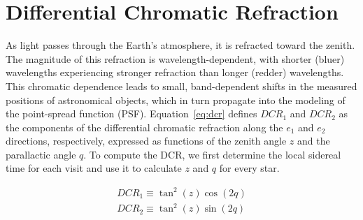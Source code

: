 \section{Differential Chromatic Refraction}
As light passes through the Earth’s atmosphere, it is refracted toward the zenith. 
The magnitude of this refraction is wavelength-dependent, with shorter (bluer) wavelengths 
experiencing stronger refraction than longer (redder) wavelengths. This chromatic dependence 
leads to small, band-dependent shifts in the measured positions of astronomical objects, 
which in turn propagate into the modeling of the point-spread function (PSF). 
Equation~\ref{eq:dcr} defines $DCR_1$ and $DCR_2$ as the components of the differential 
chromatic refraction along the $e_1$ and $e_2$ directions, respectively, expressed as 
functions of the zenith angle $z$ and the parallactic angle $q$. To compute the DCR, 
we first determine the local sidereal time for each visit and use it to calculate 
$z$ and $q$ for every star.

\begin{equation}
\label{eq:dcr}
    \begin{aligned}
        DCR_1 \equiv \tan^2(z)\cos(2q) \\
        DCR_2 \equiv \tan^2(z)\sin(2q)
    \end{aligned}
\end{equation}
